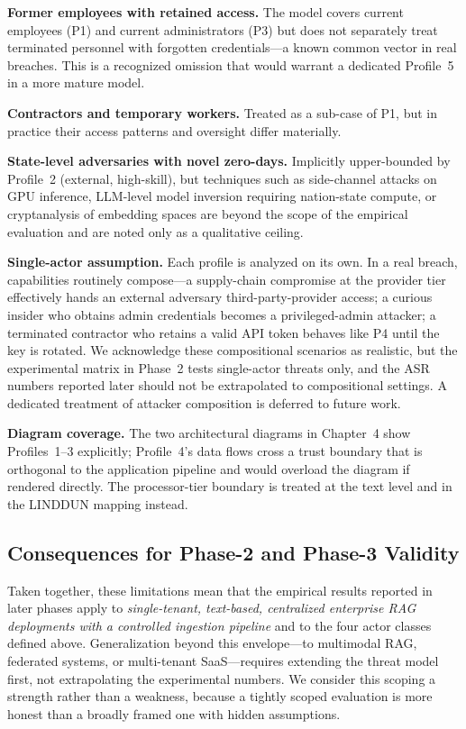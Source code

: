 \documentclass[a4paper,12pt]{report}
\begin{document}
\begin{limitbox}
\textbf{Former employees with retained access.} The model covers current
employees (P1) and current administrators (P3) but does not separately
treat terminated personnel with forgotten credentials---a known common
vector in real breaches. This is a recognized omission that would warrant
a dedicated Profile~5 in a more mature model.

\textbf{Contractors and temporary workers.} Treated as a sub-case of P1,
but in practice their access patterns and oversight differ materially.

\textbf{State-level adversaries with novel zero-days.} Implicitly
upper-bounded by Profile~2 (external, high-skill), but techniques such as
side-channel attacks on GPU inference, LLM-level model inversion
requiring nation-state compute, or cryptanalysis of embedding spaces are
beyond the scope of the empirical evaluation and are noted only as a
qualitative ceiling.

\textbf{Single-actor assumption.} Each profile is analyzed on its own.
In a real breach, capabilities routinely compose---a supply-chain
compromise at the provider tier effectively hands an external adversary
third-party-provider access; a curious insider who obtains admin
credentials becomes a privileged-admin attacker; a terminated contractor
who retains a valid API token behaves like P4 until the key is rotated.
We acknowledge these compositional scenarios as realistic, but the
experimental matrix in Phase~2 tests single-actor threats only, and the
ASR numbers reported later should not be extrapolated to compositional
settings. A dedicated treatment of attacker composition is deferred to
future work.

\textbf{Diagram coverage.} The two architectural diagrams in Chapter~4
show Profiles~1--3 explicitly; Profile~4's data flows cross a trust
boundary that is orthogonal to the application pipeline and would
overload the diagram if rendered directly. The processor-tier boundary
is treated at the text level and in the LINDDUN mapping instead.
\end{limitbox}

\subsection{Consequences for Phase-2 and Phase-3 Validity}

Taken together, these limitations mean that the empirical results reported
in later phases apply to \emph{single-tenant, text-based, centralized
enterprise RAG deployments with a controlled ingestion pipeline} and
to the four actor classes defined above. Generalization beyond this
envelope---to multimodal RAG, federated systems, or multi-tenant SaaS---requires
extending the threat model first, not extrapolating the experimental numbers.
We consider this scoping a strength rather than a weakness, because a
tightly scoped evaluation is more honest than a broadly framed one with
hidden assumptions.
\end{document}
